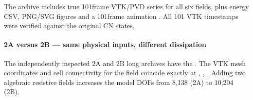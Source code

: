 \documentclass[letterpaper,10pt,english]{sphinxmanual}
\begin{document}
\sphinxAtStartPar
The archive includes true 101\sphinxhyphen{}frame VTK/PVD
series for all six fields, plus energy CSV,
PNG/SVG figures and a 101\sphinxhyphen{}frame animation
. All 101 VTK timestamps
were verified against the original CN states.


\paragraph{2A versus 2B — same physical inputs, different dissipation}
\label{\detokenize{examples/wave:a-versus-2b-same-physical-inputs-different-dissipation}}
\sphinxAtStartPar
The independently inspected 2A and 2B long
archives have the . The VTK mesh
coordinates and cell connectivity for the
field  coincide exactly at ,
, . Adding two algebraic
resistive fields increases the model DOFs
from 8,138 (2A) to 10,204 (2B).
\end{document}
